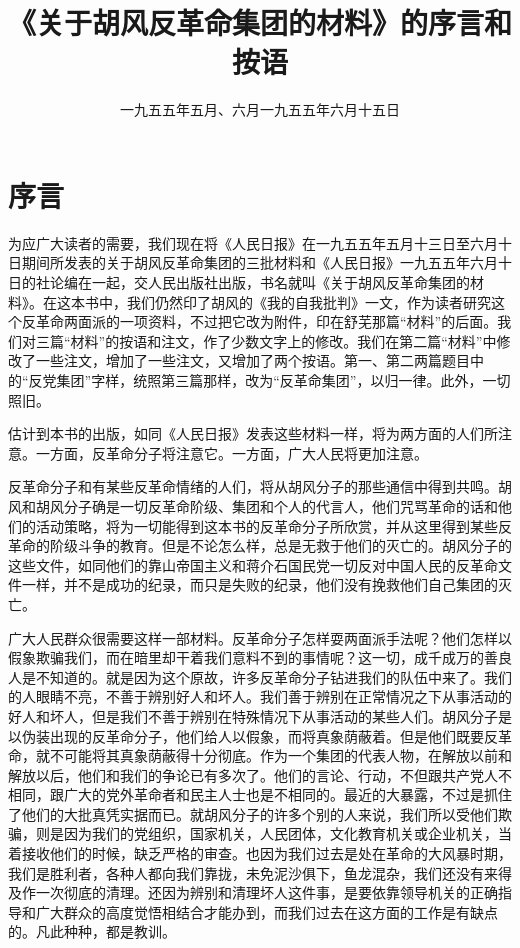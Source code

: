 
\title{《关于胡风反革命集团的材料》的序言和按语}
\date{一九五五年五月、六月}
\maketitle


\date{一九五五年六月十五日}
\section{序言}

为应广大读者的需要，我们现在将《人民日报》在一九五五年五月十三日至六月十日期间所发表的关于胡风反革命集团的三批材料和《人民日报》一九五五年六月十日的社论编在一起，交人民出版社出版，书名就叫《关于胡风反革命集团的材料》。在这本书中，我们仍然印了胡风的《我的自我批判》一文，作为读者研究这个反革命两面派的一项资料，不过把它改为附件，印在舒芜那篇“材料”的后面。我们对三篇“材料”的按语和注文，作了少数文字上的修改。我们在第二篇“材料”中修改了一些注文，增加了一些注文，又增加了两个按语。第一、第二两篇题目中的“反党集团”字样，统照第三篇那样，改为“反革命集团”，以归一律。此外，一切照旧。

估计到本书的出版，如同《人民日报》发表这些材料一样，将为两方面的人们所注意。一方面，反革命分子将注意它。一方面，广大人民将更加注意。

反革命分子和有某些反革命情绪的人们，将从胡风分子的那些通信中得到共鸣。胡风和胡风分子确是一切反革命阶级、集团和个人的代言人，他们咒骂革命的话和他们的活动策略，将为一切能得到这本书的反革命分子所欣赏，并从这里得到某些反革命的阶级斗争的教育。但是不论怎么样，总是无救于他们的灭亡的。胡风分子的这些文件，如同他们的靠山帝国主义和蒋介石国民党一切反对中国人民的反革命文件一样，并不是成功的纪录，而只是失败的纪录，他们没有挽救他们自己集团的灭亡。

广大人民群众很需要这样一部材料。反革命分子怎样耍两面派手法呢？他们怎样以假象欺骗我们，而在暗里却干着我们意料不到的事情呢？这一切，成千成万的善良人是不知道的。就是因为这个原故，许多反革命分子钻进我们的队伍中来了。我们的人眼睛不亮，不善于辨别好人和坏人。我们善于辨别在正常情况之下从事活动的好人和坏人，但是我们不善于辨别在特殊情况下从事活动的某些人们。胡风分子是以伪装出现的反革命分子，他们给人以假象，而将真象荫蔽着。但是他们既要反革命，就不可能将其真象荫蔽得十分彻底。作为一个集团的代表人物，在解放以前和解放以后，他们和我们的争论已有多次了。他们的言论、行动，不但跟共产党人不相同，跟广大的党外革命者和民主人士也是不相同的。最近的大暴露，不过是抓住了他们的大批真凭实据而已。就胡风分子的许多个别的人来说，我们所以受他们欺骗，则是因为我们的党组织，国家机关，人民团体，文化教育机关或企业机关，当着接收他们的时候，缺乏严格的审查。也因为我们过去是处在革命的大风暴时期，我们是胜利者，各种人都向我们靠拢，未免泥沙俱下，鱼龙混杂，我们还没有来得及作一次彻底的清理。还因为辨别和清理坏人这件事，是要依靠领导机关的正确指导和广大群众的高度觉悟相结合才能办到，而我们过去在这方面的工作是有缺点的。凡此种种，都是教训。

